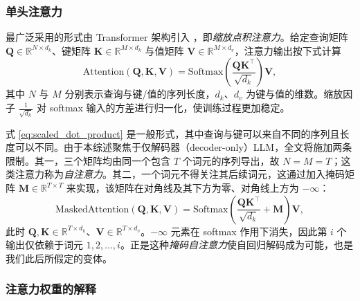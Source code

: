 \documentclass[11pt]{article}
\newcommand{\R}{\mathbb{R}}
\newcommand{\mat}[1]{\mathbf{#1}}
\begin{document}
\subsubsection{单头注意力}

最广泛采用的形式由 Transformer 架构引入 \cite{vaswani2017attention}，即\textit{缩放点积注意力}。给定查询矩阵 $\mat{Q} \in \R^{N \times d_k}$、键矩阵 $\mat{K} \in \R^{M \times d_k}$ 与值矩阵 $\mat{V} \in \R^{M \times d_v}$，注意力输出按下式计算
\begin{equation}
\text{Attention}(\mat{Q}, \mat{K}, \mat{V}) = \text{Softmax}\left( \frac{\mat{Q} \mat{K}^\top}{\sqrt{d_k}} \right) \mat{V},
\label{eq:scaled_dot_product}
\end{equation}
其中 $N$ 与 $M$ 分别表示查询与键/值的序列长度，$d_k$、$d_v$ 为键与值的维数。缩放因子 $\frac{1}{\sqrt{d_k}}$ 对 softmax 输入的方差进行归一化，使训练过程更加稳定。

式 \ref{eq:scaled_dot_product} 是一般形式，其中查询与键可以来自不同的序列且长度可以不同。由于本综述聚焦于仅解码器（decoder-only）LLM，全文将施加两条限制。其一，三个矩阵均由同一个包含 $T$ 个词元的序列导出，故 $N = M = T$；这类注意力称为\emph{自注意力}。其二，一个词元不得关注其后续词元，这通过加入掩码矩阵 $\mat{M} \in \R^{T \times T}$ 来实现，该矩阵在对角线及其下方为零、对角线上方为 $-\infty$：
\begin{equation}
\label{eq:masked_attention}
  \text{MaskedAttention}(\mat{Q}, \mat{K}, \mat{V}) = \text{Softmax}\left( \frac{\mat{Q} \mat{K}^\top}{\sqrt{d_k}} + \mat{M} \right) \mat{V},
\end{equation}
此时 $\mat{Q}, \mat{K} \in \R^{T \times d_k}$、$\mat{V} \in \R^{T \times d_v}$。$-\infty$ 元素在 softmax 作用下消失，因此第 $i$ 个输出仅依赖于词元 $1,2, \ldots, i$。正是这种\emph{掩码自注意力}使自回归解码成为可能，也是我们此后所假定的变体。

\subsubsection{注意力权重的解释}
\end{document}
